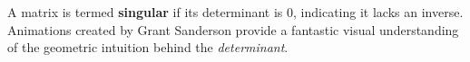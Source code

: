 \documentclass[a4paper,12pt]{report}
\newtheorem{definition}{Definition}[section]
\newcommand{\R}{\mathbb{R}}
\newcommand{\dd}{\cdot}
\begin{document}
A matrix is termed \textbf{singular} if its determinant is $0$, indicating it lacks an inverse.\\

Animations created by Grant Sanderson provide a fantastic visual understanding of the geometric intuition behind the \textit{determinant}\cite{determinant}.

% 
% 
% 
% 
% 
% 
% 
% 
% 
% 
% 
% 
% 
\end{document}
